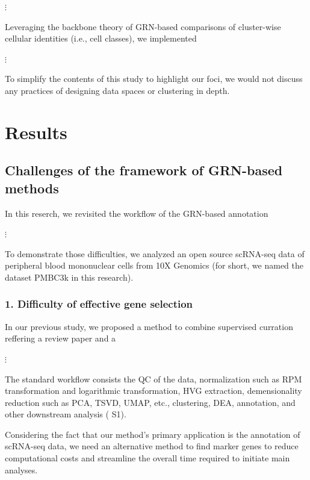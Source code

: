 \documentclass{article}
\begin{document}
$\vdots$

Leveraging the backbone theory of GRN-based comparisons of cluster-wise
cellular identities (i.e., cell classes), we implemented 

$\vdots$

To simplify the contents of this study to highlight our foci, we would not 
discuss any practices of designing data spaces or clustering in depth.

\section*{Results}
\subsection*{Challenges of the framework of GRN-based methods}
In this reserch, we revisited the workflow of the GRN-based annotation

$\vdots$

To demonstrate those difficulties, we analyzed an open source scRNA-seq data of peripheral blood mononuclear 
cells from 10X Genomics (for short, we named the dataset PMBC3k in this research).

\subsubsection*{1. Difficulty of effective gene selection}
In our previous study, we proposed a method to combine supervised curration reffering a review paper and a 

$\vdots$

The standard workflow consists the \ac{QC} of the data, normalization such as \ac{RPM} transformation and logarithmic transformation, \ac{HVG} extraction, demensionality reduction such as \ac{PCA}, 
\ac{TSVD}, \ac{UMAP}\cite{umap}, etc., clustering, \ac{DEA}, annotation, and other downstream analysis (\figurename{ S1}).

Considering the fact that 
our method's primary application is the annotation of scRNA-seq data, 
we need an alternative method to find marker genes to reduce computational costs and 
streamline the overall time required to initiate main analyses.
\end{document}
